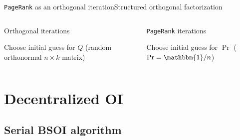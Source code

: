 \documentclass[xcolor=table,final]{beamer} %
\newcommand{\PageRank}{\texttt{PageRank}\xspace}
\newcommand{\ones}{\mathbbm{1}}
\begin{document}
\begin{frame}{\PageRank as an orthogonal iteration}{Structured orthogonal factorization}
  \begin{columns}
  \begin{block}{Orthogonal iterations}
    \begin{algorithm}[H]
      \BlankLine

      Choose initial guess for $Q$ {\small (random orthonormal $n \times k$ matrix)} \;

    \end{algorithm}
  \end{block}
  \begin{block}{\PageRank iterations}
    \begin{algorithm}[H]
      \KwResult{$\Pr$}
      \BlankLine

      Choose initial guess for $\Pr$ {\small ($\Pr = \ones/n$)} \;

    \end{algorithm}
  \end{block}
\end{columns}
\end{frame}

\section{Decentralized OI}

\subsection{Serial BSOI algorithm}
\end{document}
